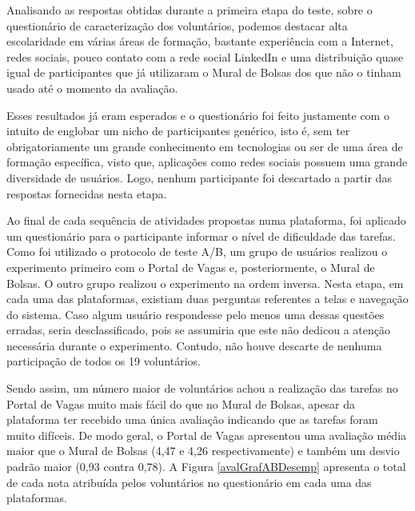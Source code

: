 Analisando as respostas obtidas durante a primeira etapa do teste, sobre o questionário de caracterização dos voluntários, podemos destacar alta escolaridade em várias áreas de formação, bastante experiência com a Internet, redes sociais, pouco contato com a rede social LinkedIn e uma distribuição quase igual de participantes que já utilizaram o Mural de Bolsas dos que não o tinham usado até o momento da avaliação. 

Esses resultados já eram esperados e o questionário foi feito justamente com o intuito de englobar um nicho de participantes genérico, isto é, sem ter obrigatoriamente um grande conhecimento em tecnologias ou ser de uma área de formação específica, visto que, aplicações como redes sociais possuem uma grande diversidade de usuários. Logo, nenhum participante foi descartado a partir das respostas fornecidas nesta etapa.

Ao final de cada sequência de atividades propostas numa plataforma, foi aplicado um questionário para o participante informar o nível de dificuldade das tarefas. Como foi utilizado o protocolo de teste A/B, um grupo de usuários realizou o experimento primeiro com o Portal de Vagas e, posteriormente, o Mural de Bolsas. O outro grupo realizou o experimento na ordem inversa. Nesta etapa, em cada uma das plataformas, existiam duas perguntas referentes a telas e navegação do sistema. Caso algum usuário respondesse pelo menos uma dessas questões erradas, seria desclassificado, pois se assumiria que este não dedicou a atenção necessária durante o experimento. Contudo, não houve descarte de nenhuma participação de todos os 19 voluntários.

Sendo assim, um número maior de voluntários achou a realização das tarefas no Portal de Vagas muito mais fácil do que no Mural de Bolsas, apesar da plataforma ter recebido uma única avaliação indicando que as tarefas foram muito difíceis. De modo geral, o Portal de Vagas apresentou uma avaliação média maior que o Mural de Bolsas (4,47 e 4,26 respectivamente) e também um desvio padrão maior (0,93 contra 0,78). A Figura \ref{avalGrafABDesemp} apresenta o total de cada nota atribuída pelos voluntários no questionário em cada uma das plataformas.

